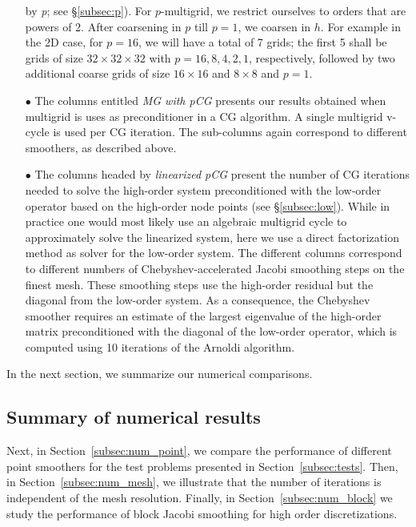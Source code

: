 \documentclass[smallcondensed,final]{svjour3}     %
\begin{document}
\begin{itemize}
  by \emph{p}; see \S\ref{subsec:p}). For $p$-multigrid, we
  restrict ourselves to orders that are powers of 2. After
  coarsening in $p$ till $p=1$, we coarsen in $h$. For example in the 2D case, 
  for $p=16$, we will have a total of 7 grids; the first 5 shall be grids of 
  size $32\times32\times32$ with $p=16,8,4,2,1$, respectively, followed by 
  two additional coarse grids of size $16\times16$ and $8\times8$ and $p=1$.
\item[$\bullet$] The columns entitled \emph{MG with pCG} presents our
  results obtained when multigrid is uses as preconditioner in a CG
  algorithm. A single multigrid v-cycle is used per CG iteration. The sub-columns 
  again correspond to different smoothers, as described above.
\item[$\bullet$] The columns headed by \emph{linearized pCG} present
  the number of CG iterations needed to solve the high-order system
  preconditioned with the low-order operator based on the high-order
  node points (see \S\ref{subsec:low}). While in practice one
  would most likely use an algebraic multigrid cycle to approximately
  solve the linearized system, here we use a direct factorization
  method as solver for the low-order system. The different columns
  correspond to different numbers of Chebyshev-accelerated Jacobi
  smoothing steps on the finest mesh. These smoothing steps use the
  high-order residual but the diagonal from the low-order system. As a
  consequence, the Chebyshev smoother requires an estimate of the
  largest eigenvalue of the high-order matrix preconditioned with the
  diagonal of the low-order operator, which is computed using
  10 iterations of the Arnoldi algorithm.
\end{itemize}
In the next section, we summarize our numerical comparisons.

\subsection{Summary of numerical results}\label{subsec:results}
Next, in Section~\ref{subsec:num_point}, we compare the performance of
different point smoothers for the test problems presented in
Section~\ref{subsec:tests}. Then, in Section~\ref{subsec:num_mesh}, we
illustrate that the number of iterations is independent of the mesh
resolution. Finally, in Section~\ref{subsec:num_block} we study the
performance of block Jacobi smoothing for high order discretizations.
\end{document}
